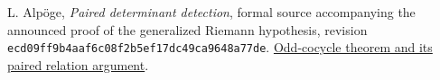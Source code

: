 L. Alp\"oge, \emph{Paired determinant detection}, formal source
accompanying the announced proof of the generalized Riemann hypothesis,
revision \texttt{ecd09ff9b4aaf6c08f2b5ef17dc49ca9648a77de}.
\href{https://github.com/jsmorph/rh/blob/ecd09ff9b4aaf6c08f2b5ef17dc49ca9648a77de/lean/src/Development/AutomorphicArithmetic/AutomorphicVarieties/PatchingModules/DeterminantPadicFree/OddPart.lean}{Odd-cocycle theorem and its paired relation argument}.
